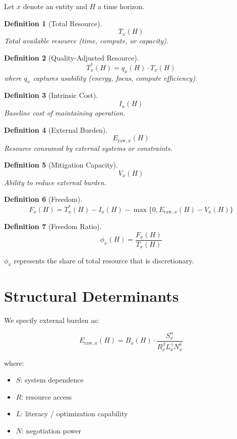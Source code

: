 \documentclass[11pt]{article}
\newtheorem{definition}{Definition}
\begin{document}
Let $x$ denote an entity and $H$ a time horizon.

\begin{definition}[Total Resource]
\[
T_x(H)
\]
Total available resource (time, compute, or capacity).
\end{definition}

\begin{definition}[Quality-Adjusted Resource]
\[
T_x^*(H) = q_x(H) \cdot T_x(H)
\]
where $q_x$ captures usability (energy, focus, compute efficiency).
\end{definition}

\begin{definition}[Intrinsic Cost]
\[
I_x(H)
\]
Baseline cost of maintaining operation.
\end{definition}

\begin{definition}[External Burden]
\[
E_{\text{raw},x}(H)
\]
Resource consumed by external systems or constraints.
\end{definition}

\begin{definition}[Mitigation Capacity]
\[
V_x(H)
\]
Ability to reduce external burden.
\end{definition}

\begin{definition}[Freedom]
\[
F_x(H) = T_x^*(H) - I_x(H) - \max\{0, E_{\text{raw},x}(H) - V_x(H)\}
\]
\end{definition}

\begin{definition}[Freedom Ratio]
\[
\phi_x(H) = \frac{F_x(H)}{T_x(H)}
\]
\end{definition}

$\phi_x$ represents the share of total resource that is discretionary.

\section{Structural Determinants}

We specify external burden as:

\[
E_{\text{raw},x}(H) = B_x(H) \cdot \frac{S_x^{\alpha}}{R_x^{\beta} L_x^{\gamma} N_x^{\delta}}
\]

where:

\begin{itemize}
\item $S$: system dependence
\item $R$: resource access
\item $L$: literacy / optimization capability
\item $N$: negotiation power
\end{itemize}
\end{document}
